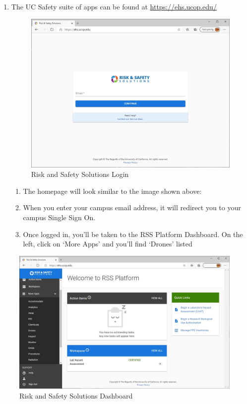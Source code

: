 \documentclass[
]{book}
\providecommand{\tightlist}{%
  \setlength{\itemsep}{0pt}\setlength{\parskip}{0pt}}
\begin{document}
\begin{enumerate}
\def\labelenumi{\arabic{enumi}.}
\item
  The UC Safety suite of apps can be found at \url{https://ehs.ucop.edu/}

  \begin{figure}

   {\centering \includegraphics[width=0.85\linewidth]{images/RSS_home} 

   }

   \caption{Risk and Safety Solutions Login}\label{fig:rss-web}
   \end{figure}

  \begin{enumerate}
  \def\labelenumii{\arabic{enumii}.}
  \tightlist
  \item
    The homepage will look similar to the image shown above:
  \item
    When you enter your campus email address, it will redirect you to your campus Single Sign On.
  \item
    Once logged in, you'll be taken to the RSS Platform Dashboard. On the left, click on `More Apps' and you'll find `Drones' listed
  \end{enumerate}
\end{enumerate}

\begin{figure}

{\centering \includegraphics[width=0.85\linewidth]{images/RSS_apps} 

}

\caption{Risk and Safety Solutions Dashboard}\label{fig:rss-dash}
\end{figure}
\end{document}
